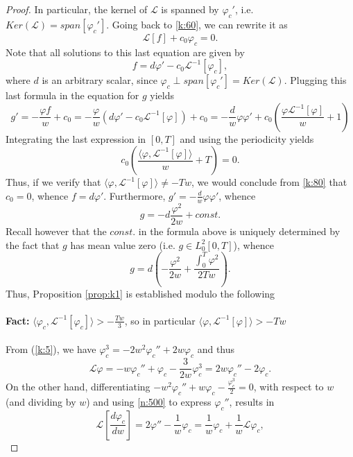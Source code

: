 \documentclass[final,11pt,leqno]{amsart}
\begin{document}
\begin{proof}
 In particular, the kernel of ${\mathcal L}$ is spanned by ${\varphi}_c'$, i.e. $Ker({\mathcal L})=span[{\varphi}_c']$. Going back to \eqref{k:60}, we can rewrite it as
$$
{\mathcal L}[f]+c_0 {\varphi}_c=0.
$$
Note that all solutions to  this last equation are given by
$$
f=d{\varphi}' - c_0 {\mathcal L}^{-1}[{\varphi}_c],
$$
where $d$ is an arbitrary scalar, since ${\varphi}_c\perp span[{\varphi}_c']= Ker({\mathcal L})$.
Plugging this last formula in the equation for $g$ yields
$$
g'=-{\frac{{{\varphi} f}}{{w}}}+c_0=-{\frac{\varphi}{{w}}}\left(d{\varphi}'-c_0{\mathcal L}^{-1}[{\varphi}]\right)+c_0=
-{\frac{{d}}{{w}}}{\varphi} {\varphi}'+c_0\left({\frac{{{\varphi} {\mathcal L}^{-1}[{\varphi}]}}{{w}}}+1\right)
$$
Integrating the last expression in $[0,T]$ and using the periodicity  yields
\begin{equation}
\label{k:80}
c_0\left({\frac{{{\langle {\varphi},{{\mathcal L}^{-1}[{\varphi}]} \rangle}}}{{w}}}+T\right)=0.
\end{equation}
Thus, if we verify that ${\langle {\varphi},{{\mathcal L}^{-1}[{\varphi}]} \rangle}\neq - T w$, we would conclude from \eqref{k:80} that $c_0=0$, whence $f=d {\varphi}'$. Furthermore,
$g'= -{\frac{{d}}{{w}}}{\varphi} {\varphi}'$, whence
$$
g=-d{\frac{{{\varphi}^2}}{{2 w}}}+const.
$$
Recall however that the $const.$ in the formula above is uniquely determined by the fact that $g$ has mean value zero (i.e. $g\in L^2_0[0,T]$),  whence
$$
g=d\left(-{\frac{{{\varphi}^2}}{{2w }}}+ {\frac{{\int_0^T {\varphi}^2}}{{2 T w}}}\right).
$$
Thus, Proposition \ref{prop:k1} is established modulo the following\\
\\
{\bf Fact:} ${\langle {{\varphi}_c},{{\mathcal L}^{-1}[{\varphi}_c]} \rangle}>-{\frac{{Tw}}{{3}}}$,  so in particular ${\langle {\varphi},{{\mathcal L}^{-1}[{\varphi}]} \rangle} > - T w$ \\
\\
  From (\ref{k:5}), we have
    ${\varphi}_c^3=-2w^2{\varphi}_c''+2w{\varphi}_c$ and thus
    \begin{equation}
    \label{n:500}
    {\mathcal L}{\varphi}=-w{\varphi}_c''+{\varphi}_c-{\frac{{3}}{{2w}}}{\varphi}_c^3=2w{\varphi}_c''-2{\varphi}_c.
    \end{equation}
    On the other hand, differentiating $-w^2{\varphi}_c''+w{\varphi}_c-{\frac{{\varphi}_c^3}{2}}=0$, with respect to $w$ (and dividing by $w$) and using \eqref{n:500} to express
    ${\varphi}_c''$,   results in
    $$
    {\mathcal L}\left[\frac{d{\varphi}_c}{dw}\right]=2{\varphi}''-{\frac{1}{w}}{\varphi}_c={\frac{1}{w}}{\varphi}_c+{\frac{1}{w}}{\mathcal L}{\varphi}_c,
$$
\end{proof}
\end{document}
